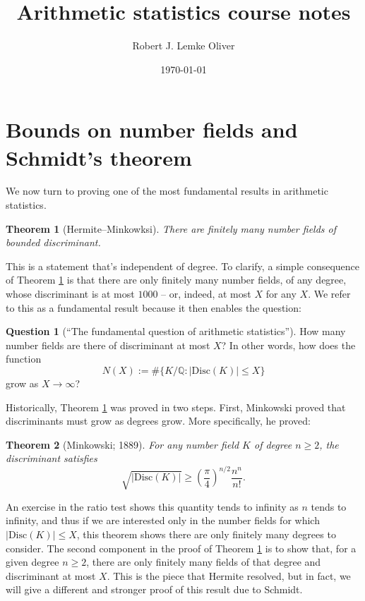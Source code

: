 \documentclass[12pt]{amsart}
\title{Arithmetic statistics course notes}
\author{Robert J. Lemke Oliver}
\date{\today}
\newtheorem{theorem}{Theorem}
\theoremstyle{definition} \newtheorem*{notation}{Notation}
\theoremstyle{remark} \newtheorem*{remark}{Remark}
\theoremstyle{remark} \newtheorem*{example}{Example}
\theoremstyle{definition} \newtheorem*{definition}{Definition}
\theoremstyle{definition} \newtheorem*{question}{Question}
\numberwithin{equation}{section}
\numberwithin{theorem}{section}
\begin{document}
	\maketitle
	
	\setcounter{section}{2}
	
\section{Bounds on number fields and Schmidt's theorem}
	
	We now turn to proving one of the most fundamental results in arithmetic statistics.  
	
	\begin{theorem}[Hermite--Minkowksi] \label{thm:hermite-minkowski}
		There are finitely many number fields of bounded discriminant.
	\end{theorem}
	
	This is a statement that's independent of degree.  To clarify, a simple consequence of Theorem \ref{thm:hermite-minkowski} is that there are only finitely many number fields, of any degree, whose discriminant is at most $1000$ -- or, indeed, at most $X$ for any $X$.  We refer to this as a fundamental result because it then enables the question:
	
	\begin{question}[``The fundamental question of arithmetic statistics'']
		How many number fields are there of discriminant at most $X$?  In other words, how does the function
			\[
				N(X)
					:= \#\{ K/\mathbb{Q} : |\mathrm{Disc}(K)| \leq X\}
			\]
		grow as $X \to \infty$?
	\end{question}

	Historically, Theorem \ref{thm:hermite-minkowski} was proved in two steps.  First, Minkowski proved that discriminants must grow as degrees grow.  More specifically, he proved:
	\begin{theorem}[Minkowski; 1889] \label{thm:minkowski}
		For any number field $K$ of degree $n \geq 2$, the discriminant satisfies
			\[
				\sqrt{|\mathrm{Disc}(K)|}
				\geq \left(\frac{\pi}{4}\right)^{n/2} \frac{n^n}{n!}.
			\]
	\end{theorem}
	
	An exercise in the ratio test shows this quantity tends to infinity as $n$ tends to infinity, and thus if we are interested only in the number fields for which $|\mathrm{Disc}(K)| \leq X$, this theorem shows there are only finitely many degrees to consider.  The second component in the proof of Theorem \ref{thm:hermite-minkowski} is to show that, for a given degree $n \geq 2$, there are only finitely many fields of that degree and discriminant at most $X$.  This is the piece that Hermite resolved, but in fact, we will give a different and stronger proof of this result due to Schmidt.
	
\end{document}
